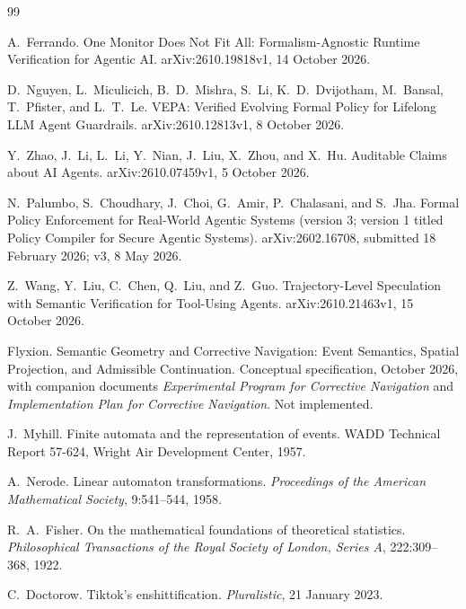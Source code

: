 \documentclass[11pt]{article}
\theoremstyle{definition}
\theoremstyle{remark}
\begin{document}
\begin{thebibliography}{99}

A.~Ferrando.
\newblock One Monitor Does Not Fit All: Formalism-Agnostic Runtime Verification for Agentic AI.
\newblock arXiv:2610.19818v1, 14 October 2026.

D.~Nguyen, L.~Miculicich, B.~D.~Mishra, S.~Li, K.~D.~Dvijotham, M.~Bansal, T.~Pfister, and L.~T.~Le.
\newblock VEPA: Verified Evolving Formal Policy for Lifelong LLM Agent Guardrails.
\newblock arXiv:2610.12813v1, 8 October 2026.

Y.~Zhao, J.~Li, L.~Li, Y.~Nian, J.~Liu, X.~Zhou, and X.~Hu.
\newblock Auditable Claims about AI Agents.
\newblock arXiv:2610.07459v1, 5 October 2026.

N.~Palumbo, S.~Choudhary, J.~Choi, G.~Amir, P.~Chalasani, and S.~Jha.
\newblock Formal Policy Enforcement for Real-World Agentic Systems (version 3; version 1 titled Policy Compiler for Secure Agentic Systems).
\newblock arXiv:2602.16708, submitted 18 February 2026; v3, 8 May 2026.

Z.~Wang, Y.~Liu, C.~Chen, Q.~Liu, and Z.~Guo.
\newblock Trajectory-Level Speculation with Semantic Verification for Tool-Using Agents.
\newblock arXiv:2610.21463v1, 15 October 2026.

Flyxion.
\newblock Semantic Geometry and Corrective Navigation: Event Semantics, Spatial Projection, and Admissible Continuation.
\newblock Conceptual specification, October 2026, with companion documents \emph{Experimental Program for Corrective Navigation} and \emph{Implementation Plan for Corrective Navigation}. Not implemented.

J.~Myhill.
\newblock Finite automata and the representation of events.
\newblock WADD Technical Report 57-624, Wright Air Development Center, 1957.

A.~Nerode.
\newblock Linear automaton transformations.
\newblock \emph{Proceedings of the American Mathematical Society}, 9:541--544, 1958.

R.~A.~Fisher.
\newblock On the mathematical foundations of theoretical statistics.
\newblock \emph{Philosophical Transactions of the Royal Society of London, Series A}, 222:309--368, 1922.

C.~Doctorow.
\newblock Tiktok's enshittification.
\newblock \emph{Pluralistic}, 21 January 2023.


\end{thebibliography}
\end{document}
